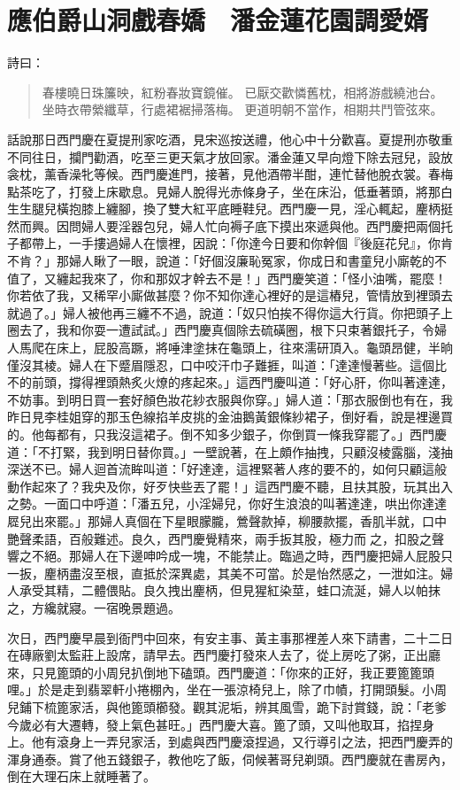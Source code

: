 
\chapter{應伯爵山洞戲春嬌　潘金蓮花園調愛婿}

詩曰：
\begin{quote}
春樓曉日珠簾映，紅粉春妝寶鏡催。
已厭交歡憐舊枕，相將游戲繞池台。
坐時衣帶縈纖草，行處裙裾掃落梅。
更道明朝不當作，相期共鬥管弦來。
\end{quote}

話說那日西門慶在夏提刑家吃酒，見宋巡按送禮，他心中十分歡喜。夏提刑亦敬重不同往日，攔門勸酒，吃至三更天氣才放回家。潘金蓮又早向燈下除去冠兒，設放衾枕，薰香澡牝等候。西門慶進門，接著，見他酒帶半酣，連忙替他脫衣裳。春梅點茶吃了，打發上床歇息。見婦人脫得光赤條身子，坐在床沿，低垂著頭，將那白生生腿兒橫抱膝上纏腳，換了雙大紅平底睡鞋兒。西門慶一見，淫心輒起，麈柄挺然而興。因問婦人要淫器包兒，婦人忙向褥子底下摸出來遞與他。西門慶把兩個托子都帶上，一手摟過婦人在懷裡，因說：「你達今日要和你幹個『後庭花兒』，你肯不肯？」那婦人瞅了一眼，說道：「好個沒廉恥冤家，你成日和書童兒小廝乾的不值了，又纏起我來了，你和那奴才幹去不是！」西門慶笑道：「怪小油嘴，罷麼！你若依了我，又稀罕小廝做甚麼？你不知你達心裡好的是這樁兒，管情放到裡頭去就過了。」婦人被他再三纏不不過，說道：「奴只怕挨不得你這大行貨。你把頭子上圈去了，我和你耍一遭試試。」西門慶真個除去硫磺圈，根下只束著銀托子，令婦人馬爬在床上，屁股高蹶，將唾津塗抹在龜頭上，往來濡研頂入。龜頭昂健，半晌僅沒其棱。婦人在下蹙眉隱忍，口中咬汗巾子難捱，叫道：「達達慢著些。這個比不的前頭，撐得裡頭熱炙火燎的疼起來。」這西門慶叫道：「好心肝，你叫著達達，不妨事。到明日買一套好顏色妝花紗衣服與你穿。」婦人道：「那衣服倒也有在，我昨日見李桂姐穿的那玉色線掐羊皮挑的金油鵝黃銀條紗裙子，倒好看，說是裡邊買的。他每都有，只我沒這裙子。倒不知多少銀子，你倒買一條我穿罷了。」西門慶道：「不打緊，我到明日替你買。」一壁說著，在上頗作抽拽，只顧沒棱露腦，淺抽深送不已。婦人迴首流眸叫道：「好達達，這裡緊著人疼的要不的，如何只顧這般動作起來了？我央及你，好歹快些丟了罷！」這西門慶不聽，且扶其股，玩其出入之勢。一面口中呼道：「潘五兒，小淫婦兒，你好生浪浪的叫著達達，哄出你達達㞞兒出來罷。」那婦人真個在下星眼朦朧，鶯聲款掉，柳腰款擺，香肌半就，口中艷聲柔語，百般難述。良久，西門慶覺精來，兩手扳其股，極力而𢵞之，扣股之聲響之不絕。那婦人在下邊呻吟成一塊，不能禁止。臨過之時，西門慶把婦人屁股只一扳，麈柄盡沒至根，直抵於深異處，其美不可當。於是怡然感之，一泄如注。婦人承受其精，二體偎貼。良久拽出麈柄，但見猩紅染莖，蛙口流涎，婦人以帕抹之，方纔就寢。一宿晚景題過。

次日，西門慶早晨到衙門中回來，有安主事、黃主事那裡差人來下請書，二十二日在磚廠劉太監莊上設席，請早去。西門慶打發來人去了，從上房吃了粥，正出廳來，只見篦頭的小周兒扒倒地下磕頭。西門慶道：「你來的正好，我正要篦篦頭哩。」於是走到翡翠軒小捲棚內，坐在一張涼椅兒上，除了巾幘，打開頭髮。小周兒鋪下梳篦家活，與他篦頭櫛發。觀其泥垢，辨其風雪，跪下討賞錢，說：「老爹今歲必有大遷轉，發上氣色甚旺。」西門慶大喜。篦了頭，又叫他取耳，掐捏身上。他有滾身上一弄兒家活，到處與西門慶滾捏過，又行導引之法，把西門慶弄的渾身通泰。賞了他五錢銀子，教他吃了飯，伺候著哥兒剃頭。西門慶就在書房內，倒在大理石床上就睡著了。

